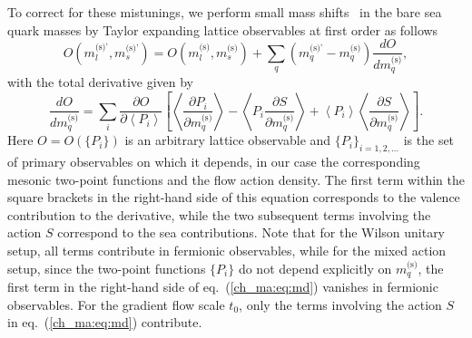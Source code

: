 To correct for these mistunings, we perform small mass shifts~\citep{Bruno:2016plf} in the bare sea quark masses by Taylor expanding lattice observables at first order as follows
\begin{equation}
\label{ch_ma:eq:mass_shift}
{O}\left(m_l^{\textrm{(s)'}},m_s^{\textrm{(s)'}}\right)={O}\left(m_l^{\textrm{(s)}},m_s^{\textrm{(s)}}\right)+\sum_q\left(m_q^{\textrm{(s)'}}-m_q^{\textrm{(s)}}\right)\frac{d{O}}{dm_q^{\textrm{(s)}}},
\end{equation}
with the total derivative given by
\begin{equation}
\label{ch_ma:eq:md}
\frac{d{O}}{dm_q^{\textrm{(s)}}}=\sum_i\frac{\partial{O}}{\partial \left<P_i\right>}\left[\left<\frac{\partial P_i}{\partial m_q^{\textrm{(s)}}}\right>-\left<P_i\frac{\partial S}{\partial m_q^{\textrm{(s)}}}\right>+\left<P_i\right>\left<\frac{\partial S}{\partial m_q^{\textrm{(s)}}}\right>\right].
\end{equation}
Here $O=O\left(\{P_i\}\right)$ is an arbitrary lattice observable and $\{P_i\}_{i=1,2,...}$ is the set of primary observables on which it depends, in our case the corresponding mesonic two-point functions and the flow action density. The first term within the square brackets in the right-hand side of this equation corresponds to the valence contribution to the derivative, while the two subsequent terms involving the action $S$ correspond to the sea contributions. Note that for the Wilson unitary setup, all terms contribute in fermionic observables, while for the mixed action setup, since the two-point functions $\{P_i\}$ do not depend explicitly on $m_q^{\textrm{(s)}}$, the first term in the right-hand side of eq.~(\ref{ch_ma:eq:md}) vanishes in fermionic observables. For the gradient flow scale $t_0$, only the terms involving the action $S$ in eq.~(\ref{ch_ma:eq:md}) contribute.

